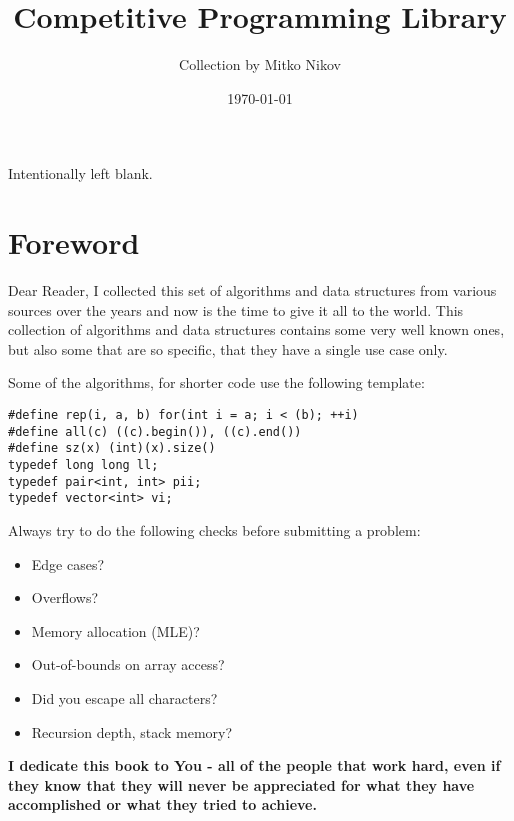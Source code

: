 \documentclass{article}
\title{\textbf{Competitive Programming Library}}
\author{Collection by Mitko Nikov}
\date{\today}
\begin{document}
\maketitle

\newpage

\vspace*{\fill}
\begin{center}
  Intentionally left blank.
\end{center}
\vspace*{\fill}

\newpage

\tableofcontents

\newpage

\section{Foreword}

Dear Reader, I collected this set of algorithms and data structures from various sources
over the years and now is the time to give it all to the world. This collection of algorithms
and data structures contains some very well known ones, but also some that are so specific, that
they have a single use case only.

Some of the algorithms, for shorter code use the following template:

\begin{lstlisting}
#define rep(i, a, b) for(int i = a; i < (b); ++i)
#define all(c) ((c).begin()), ((c).end())
#define sz(x) (int)(x).size()
typedef long long ll;
typedef pair<int, int> pii;
typedef vector<int> vi;
\end{lstlisting}

Always try to do the following checks before submitting a problem:
\begin{itemize}
  \item Edge cases?
  \item Overflows?
  \item Memory allocation (MLE)?
  \item Out-of-bounds on array access?
  \item Did you escape all characters?
  \item Recursion depth, stack memory?
\end{itemize}

\noindent \hrulefill

\textbf{I dedicate this book to You - all of the people that work hard, even if they know
that they will never be appreciated for what they have accomplished or what they tried to achieve.}
\end{document}
